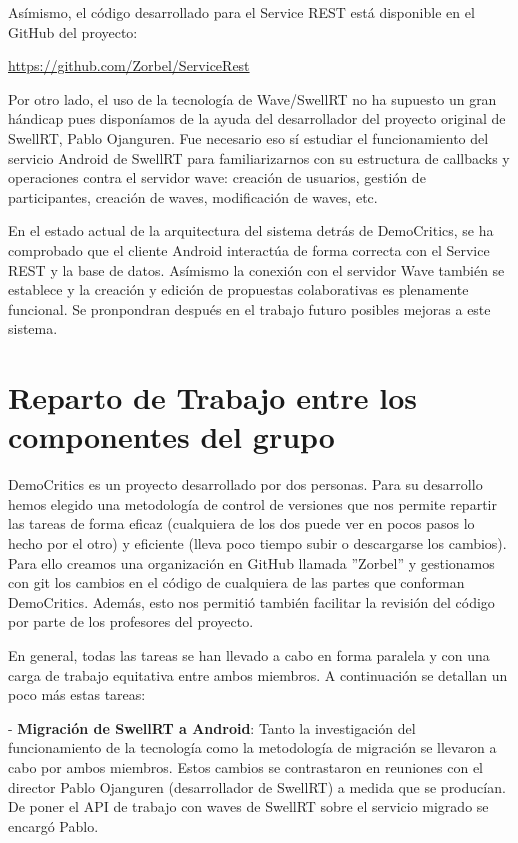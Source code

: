 Asímismo, el código desarrollado para el Service REST está disponible en el GitHub del proyecto:

\url{https://github.com/Zorbel/ServiceRest}

Por otro lado, el uso de la tecnología de Wave/SwellRT no ha supuesto un gran hándicap pues disponíamos de la ayuda del desarrollador del proyecto original de SwellRT, Pablo Ojanguren. Fue necesario eso sí estudiar el funcionamiento del servicio Android de SwellRT para familiarizarnos con su estructura de callbacks y operaciones contra el servidor wave: creación de usuarios, gestión de participantes, creación de waves, modificación de waves, etc.

En el estado actual de la arquitectura del sistema detrás de DemoCritics, se ha comprobado que el cliente Android interactúa de forma correcta con el Service REST y la base de datos. Asímismo  la conexión con el servidor Wave también se establece y la creación y edición de propuestas colaborativas es plenamente funcional. Se pronpondran después en el trabajo futuro posibles mejoras a este sistema.

\section{Reparto de Trabajo entre los componentes del grupo} 

DemoCritics es un proyecto desarrollado por dos personas. Para su desarrollo hemos elegido una metodología de control de versiones que nos permite repartir las tareas de forma eficaz (cualquiera de los dos puede ver en pocos pasos lo hecho por el otro) y eficiente (lleva poco tiempo subir o descargarse los cambios). Para ello creamos una organización en GitHub llamada ''Zorbel'' y gestionamos con git los cambios en el código de cualquiera de las partes que conforman DemoCritics. Además, esto nos permitió también facilitar la revisión del código por parte de los profesores del proyecto. 

En general, todas las tareas se han llevado a cabo en forma paralela y con una carga de trabajo equitativa entre ambos miembros. A continuación se detallan un poco más estas tareas:

- \textbf{Migración de SwellRT a Android}: Tanto la investigación del funcionamiento de la tecnología como la metodología de migración se llevaron a cabo por ambos miembros. Estos cambios se contrastaron en reuniones con el director Pablo Ojanguren (desarrollador de SwellRT) a medida que se producían. De poner el API de trabajo con waves de SwellRT sobre el servicio migrado se encargó Pablo.

